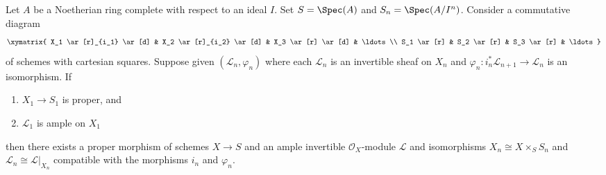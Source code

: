 \begin{theorem}
\label{theorem-algebraization}
Let $A$ be a Noetherian ring complete with respect to an ideal $I$.
Set $S = \Spec(A)$ and $S_n = \Spec(A/I^n)$. Consider a commutative
diagram
$$
\xymatrix{
X_1 \ar[r]_{i_1} \ar[d] & X_2 \ar[r]_{i_2} \ar[d] & X_3 \ar[r] \ar[d] &
\ldots \\
S_1 \ar[r] & S_2 \ar[r] & S_3 \ar[r] & \ldots
}
$$
of schemes with cartesian squares. Suppose given $(\mathcal{L}_n, \varphi_n)$
where each $\mathcal{L}_n$ is an invertible sheaf on $X_n$ and
$\varphi_n : i_n^*\mathcal{L}_{n + 1} \to \mathcal{L}_n$
is an isomorphism. If
\begin{enumerate}
\item $X_1 \to S_1$ is proper, and
\item $\mathcal{L}_1$ is ample on $X_1$
\end{enumerate}
then there exists a proper morphism of schemes $X \to S$
and an ample invertible $\mathcal{O}_X$-module $\mathcal{L}$
and isomorphisms $X_n \cong X \times_S S_n$ and
$\mathcal{L}_n \cong \mathcal{L}|_{X_n}$ compatible with
the morphisms $i_n$ and $\varphi_n$.
\end{theorem}

